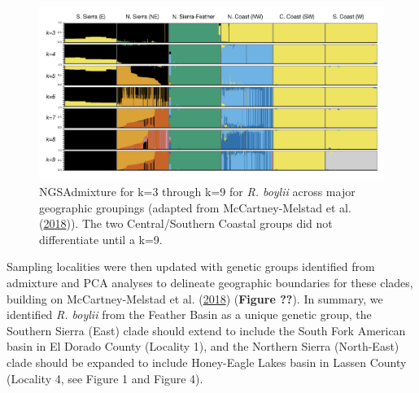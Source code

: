 \documentclass[proquest,12pt,final]{ucthesis-CA2012} %
\begin{document}
\begin{ucmainmatter}
\begin{figure}

{\centering \includegraphics[width=0.95\linewidth]{figure/ch3/fig_03_admix_stacked_combined_rabo_filt_100k} 

}

\caption{NGSAdmixture for k=3 through k=9 for \emph{R. boylii}
across major geographic groupings (adapted from McCartney-Melstad et al.
(\protect\hyperlink{ref-mccartney-melstad_population_2018}{2018})). The
two Central/Southern Coastal groups did not differentiate until a k=9.}\label{fig:CH3F3admix}
\end{figure}
Sampling localities were then updated with genetic groups identified
from admixture and PCA analyses to delineate geographic boundaries for
these clades, building on McCartney-Melstad et al.
(\protect\hyperlink{ref-mccartney-melstad_population_2018}{2018})
(\textbf{Figure ??}). In summary, we identified \emph{R. boylii} from
the Feather Basin as a unique genetic group, the Southern Sierra (East)
clade should extend to include the South Fork American basin in El
Dorado County (Locality 1), and the Northern Sierra (North-East) clade
should be expanded to include Honey-Eagle Lakes basin in Lassen County
(Locality 4, see Figure 1 and Figure 4).

\clearpage






\begin{figure}


\end{figure}
\end{ucmainmatter}
\end{document}
